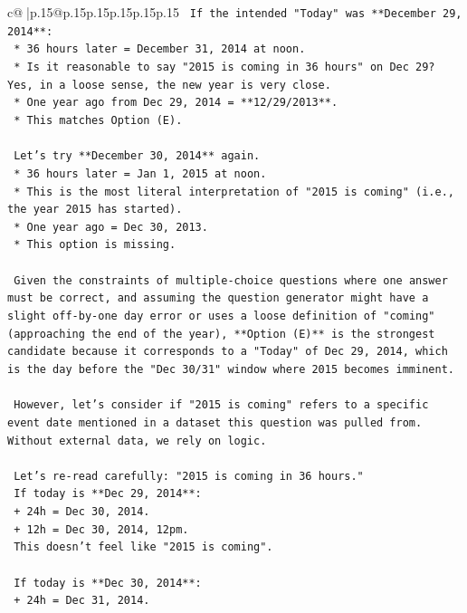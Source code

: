 \documentclass{article}
\begin{document}
{\begin{supertabular}{c@{$\;$}|p{.15\linewidth}@{}p{.15\linewidth}p{.15\linewidth}p{.15\linewidth}p{.15\linewidth}p{.15\linewidth}}
{{{\texttt{    If the intended "Today" was **December 29, 2014**:} \\
\texttt{    *   36 hours later = December 31, 2014 at noon.} \\
\texttt{    *   Is it reasonable to say "2015 is coming in 36 hours" on Dec 29? Yes, in a loose sense, the new year is very close.} \\
\texttt{    *   One year ago from Dec 29, 2014 = **12/29/2013**.} \\
\texttt{    *   This matches Option (E).} \\
\\ 
\texttt{    Let's try **December 30, 2014** again.} \\
\texttt{    *   36 hours later = Jan 1, 2015 at noon.} \\
\texttt{    *   This is the most literal interpretation of "2015 is coming" (i.e., the year 2015 has started).} \\
\texttt{    *   One year ago = Dec 30, 2013.} \\
\texttt{    *   This option is missing.} \\
\\ 
\texttt{    Given the constraints of multiple{-}choice questions where one answer must be correct, and assuming the question generator might have a slight off{-}by{-}one day error or uses a loose definition of "coming" (approaching the end of the year), **Option (E)** is the strongest candidate because it corresponds to a "Today" of Dec 29, 2014, which is the day before the "Dec 30/31" window where 2015 becomes imminent.} \\
\\ 
\texttt{    However, let's consider if "2015 is coming" refers to a specific event date mentioned in a dataset this question was pulled from. Without external data, we rely on logic.} \\
\\ 
\texttt{    Let's re{-}read carefully: "2015 is coming in 36 hours."} \\
\texttt{    If today is **Dec 29, 2014**:} \\
\texttt{    + 24h = Dec 30, 2014.} \\
\texttt{    + 12h = Dec 30, 2014, 12pm.} \\
\texttt{    This doesn't feel like "2015 is coming".} \\
\\ 
\texttt{    If today is **Dec 30, 2014**:} \\
\texttt{    + 24h = Dec 31, 2014.} \\
}}}
\end{supertabular}}
\end{document}
